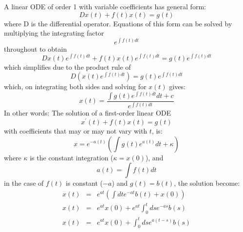 \documentclass[paper=a4, fontsize=11pt]{scrartcl}
\numberwithin{equation}{section} %
\numberwithin{figure}{section} %
\numberwithin{table}{section} %
\begin{document}
A linear ODE of order 1 with variable coefficients has general form:
\begin{equation*}
Dx(t) + f(t)x(t) = g(t)
\end{equation*}
where D is the differential operator. Equations of this form can be solved by multiplying the integrating factor
\begin{equation*}
e^{\int f(t) dt}
\end{equation*}
throughout to obtain
\begin{equation*}
Dx(t) e^{\int f(t) dt} + f(t)x(t)e^{\int f(t) dt} = g(t)e^{\int f(t) dt}
\end{equation*}
which simplifies due to the product rule of
\begin{equation*}
D(x(t) e^{\int f(t) dt}) = g(t)e^{\int f(t) dt}
\end{equation*}
which, on integrating both sides and solving for $x(t)$ gives:
\begin{equation*}
x(t) = \frac{\int g(t)e^{\int f(t) dt} dt + c}{e^{\int f(t) dt}}
\end{equation*}
In other words: The solution of a first-order linear ODE
\begin{equation*}
x^\prime(t) + f(t)x(t) = g(t)
\end{equation*}
with coefficients that may or may not vary with $t$, is:
\begin{equation*}
x = e^{-a(t)} \left(\int g(t)e^{a(t)}dt + \kappa \right)
\end{equation*}
where $\kappa$ is the constant integration ($\kappa = x(0)$), and
\begin{equation*}
a(t) = \int f(t) dt
\end{equation*}
in the case of $f(t)$ is constant ($-a$) and $g(t) = b(t)$, the solution become:
\begin{eqnarray*}
x(t) &=& e^{at}\left(\int dt e^{-at} b(t) + x(0) \right)\\
x(t) &=& e^{at}x(0) + e^{at}\int_0^t ds e^{-as} b(s)\\
x(t) &=& e^{at}x(0) + \int_0^t ds e^{a(t-s)} b(s)
\end{eqnarray*}
\end{document}
